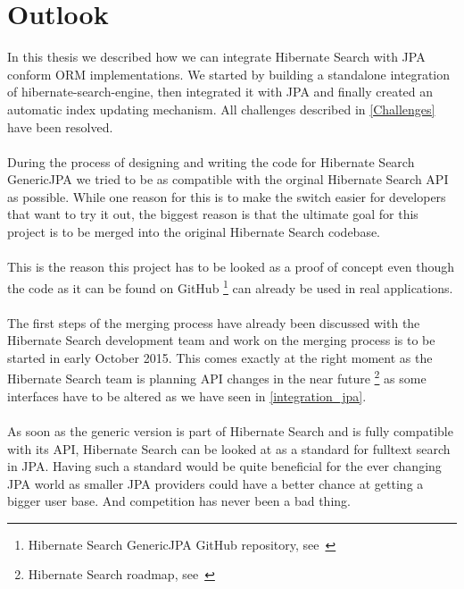 \section{Outlook}\label{outlook}

In this thesis we described how we can integrate Hibernate Search with JPA conform ORM implementations. We started by building a standalone integration of hibernate-search-engine, then integrated it with JPA and finally created an automatic index updating mechanism. All challenges described in \ref{Challenges} have been resolved.
\\\\
During the process of designing and writing the code for Hibernate Search GenericJPA we tried to be as compatible with the orginal Hibernate Search API as possible. While one reason for this is to make the switch easier for developers that want to try it out, the biggest reason is that the ultimate goal for this project is to be merged into the original Hibernate Search codebase.
\\\\
This is the reason this project has to be looked as a proof of concept even though the code as it can be found on GitHub \footnote{Hibernate Search GenericJPA GitHub repository, see~\cite{hibernate_genericjpa_github}} can already be used in real applications.
\\\\
The first steps of the merging process have already been discussed with the Hibernate Search development team and work on the merging process is to be started in early October 2015. This comes exactly at the right moment as the Hibernate Search team is planning API changes in the near future \footnote{Hibernate Search roadmap, see~\cite{hibernate_search_roadmap}} as some interfaces have to be altered as we have seen in \ref{integration_jpa}.
\\\\
As soon as the generic version is part of Hibernate Search and is fully compatible with its API, Hibernate Search can be looked at as a standard for fulltext search in JPA. Having such a standard would be quite beneficial for the ever changing JPA world as smaller JPA providers could have a better chance at getting a bigger user base. And competition has never been a bad thing.